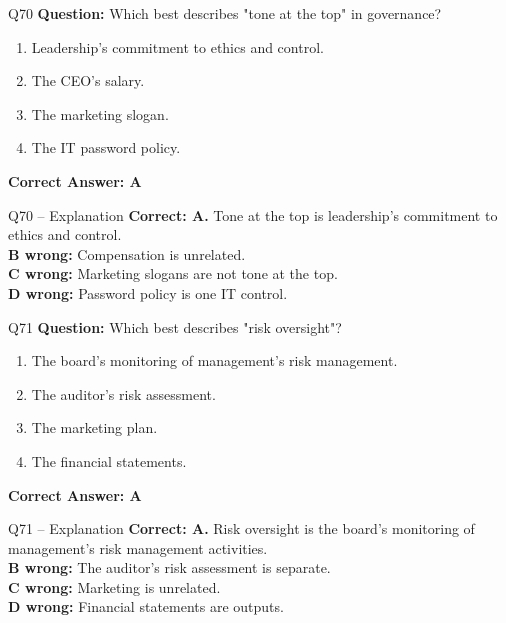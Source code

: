 \documentclass[aspectratio=169,10pt]{beamer}
\begin{document}
	\begin{frame}[t]{Q70}
		\small
		\textbf{Question:} Which best describes "tone at the top" in governance?
		\begin{enumerate}[label=\Alph*.,itemsep=1pt,topsep=2pt]
			\item Leadership's commitment to ethics and control.
			\item The CEO's salary.
			\item The marketing slogan.
			\item The IT password policy.
		\end{enumerate}
		\vspace{4pt}
		\textbf{Correct Answer: A}
	\end{frame}
	
	\begin{frame}[t]{Q70 -- Explanation}
		\small
		\textbf{Correct: A.} Tone at the top is leadership's commitment to ethics and control. \\[4pt]
		\textbf{B wrong:} Compensation is unrelated. \\[2pt]
		\textbf{C wrong:} Marketing slogans are not tone at the top. \\[2pt]
		\textbf{D wrong:} Password policy is one IT control.
	\end{frame}
	
	\begin{frame}[t]{Q71}
		\small
		\textbf{Question:} Which best describes "risk oversight"?
		\begin{enumerate}[label=\Alph*.,itemsep=1pt,topsep=2pt]
			\item The board's monitoring of management's risk management.
			\item The auditor's risk assessment.
			\item The marketing plan.
			\item The financial statements.
		\end{enumerate}
		\vspace{4pt}
		\textbf{Correct Answer: A}
	\end{frame}
	
	\begin{frame}[t]{Q71 -- Explanation}
		\small
		\textbf{Correct: A.} Risk oversight is the board's monitoring of management's risk management activities. \\[4pt]
		\textbf{B wrong:} The auditor's risk assessment is separate. \\[2pt]
		\textbf{C wrong:} Marketing is unrelated. \\[2pt]
		\textbf{D wrong:} Financial statements are outputs.
	\end{frame}
	
\end{document}
